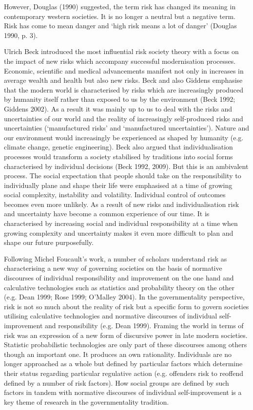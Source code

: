 However, Douglas (1990) suggested, the term risk has changed its meaning in contemporary western societies. It is no longer a neutral but a negative term. Risk has come to mean danger and `high risk means a lot of danger' (Douglas 1990, p. 3). 

Ulrich Beck introduced the most influential risk society theory with a focus on the impact of new risks which accompany successful modernisation processes. Economic, scientific and medical advancements manifest not only in increases in average wealth and health but also new risks. Beck and also Giddens emphasise that the modern world is characterised by risks which are increasingly produced by humanity itself rather than exposed to us by the environment (Beck 1992; Giddens 2002). As a result it was mainly up to us to deal with the risks and uncertainties of our world and the reality of increasingly self-produced risks and uncertainties (`manufactured risks' and `manufactured uncertainties'). Nature and our environment would increasingly be experienced as shaped by humanity (e.g. climate change, genetic engineering). Beck also argued that individualisation processes would transform a society stabilised by traditions into social forms characterised by individual decisions (Beck 1992, 2009). But this is an ambivalent process. The social expectation that people should take on the responsibility to individually plane and shape their life were emphasised at a time of growing social complexity, instability and volatility. Individual control of outcomes becomes even more unlikely. As a result of new risks and individualisation risk and uncertainty have become a common experience of our time. It is characterised by increasing social and individual responsibility at a time when growing complexity and uncertainty makes it even more difficult to plan and shape our future purposefully.

Following Michel Foucault's work, a number of scholars understand risk as characterising a new way of governing societies on the basis of normative discourses of individual responsibility and improvement on the one hand and calculative technologies such as statistics and probability theory on the other (e.g. Dean 1999; Rose 1999; O'Malley 2004). In the governmentality perspective, risk is not so much about the reality of risk but a specific form to govern societies utilising calculative technologies and normative discourses of individual self-improvement and responsibility (e.g. Dean 1999). Framing the world in terms of risk was an expression of a new form of discursive power in late modern societies. Statistic probabilistic technologies are only part of these discourses among others though an important one. It produces an own rationality. Individuals are no longer approached as a whole but defined by particular factors which determine their status regarding particular regulative action (e.g. offenders risk to reoffend defined by a number of risk factors). How social groups are defined by such factors in tandem with normative discourses of individual self-improvement is a key theme of research in the governmentality tradition. 

